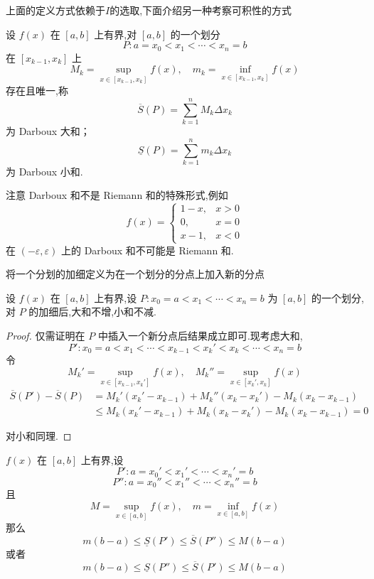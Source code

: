 上面的定义方式依赖于$I$的选取,下面介绍另一种考察可积性的方式
\begin{definition}
	
	设 $f(x)$ 在 $[a,b]$ 上有界,对 $[a,b]$ 的一个划分
	\[
	P: a = x_0 < x_1 < \cdots < x_n = b
	\]
	在 $[x_{k-1}, x_k]$ 上
	\[
	M_k = \sup_{x \in [x_{k-1}, x_k]} f(x), \quad m_k = \inf_{x \in [x_{k-1}, x_k]} f(x)
	\]
	存在且唯一,称
	\[
	\overline{S}(P) = \sum_{k=1}^n M_k \Delta x_k
	\]
	为 Darboux 大和；
	\[
	\underline{S}(P) = \sum_{k=1}^n m_k \Delta x_k
	\]
	为 Darboux 小和.
	
\end{definition}


注意 Darboux 和不是 Riemann 和的特殊形式,例如
\[
f(x)=
\begin{cases}
	1-x, & x>0 \\[4pt]
	0, & x=0 \\[4pt]
	x-1, & x<0
\end{cases}
\]
在 $(-\varepsilon, \varepsilon)$ 上的 Darboux 和不可能是 Riemann 和.
\begin{definition}
	将一个分划的加细定义为在一个划分的分点上加入新的分点
\end{definition}
\begin{lemma}\label{大和不增,小和不减}
	设 $f(x)$ 在 $[a,b]$ 上有界,设 $P: x_0 = a < x_1 < \cdots < x_n = b$ 为 $[a,b]$ 的一个划分,对 $P$ 的加细后,大和不增,小和不减.
\end{lemma}
\begin{proof}
	仅需证明在 $P$ 中插入一个新分点后结果成立即可.现考虑大和,
	\[
	P': x_0 = a < x_1 < \cdots < x_{k-1} < x_k' < x_k < \cdots < x_n = b
	\]
	令
	\[
	M_k' = \sup_{x \in [x_{k-1}, x_k']} f(x), \quad M_k'' = \sup_{x \in [x_k', x_k]} f(x)
	\]
	\[
	\begin{aligned}
		\overline{S}(P') - \overline{S}(P) &= M_k'(x_k' - x_{k-1}) + M_k''(x_k - x_k') - M_k(x_k - x_{k-1}) \\
		&\leq M_k(x_k' - x_{k-1}) + M_k(x_k - x_k') - M_k(x_k - x_{k-1}) = 0
	\end{aligned}
	\]
	
	对小和同理.
\end{proof}
\begin{lemma}
	$f(x)$ 在 $[a,b]$ 上有界,设
	\[
	P': a = x_0' < x_1' < \cdots < x_n' = b
	\]
	\[
	P'': a = x_0'' < x_1'' < \cdots < x_n'' = b
	\]
	且
	\[
	M = \sup_{x \in [a,b]} f(x), \quad m = \inf_{x \in [a,b]} f(x)
	\]
	那么
	\[
	m(b-a) \leq \underline{S}(P') \leq \overline{S}(P'') \leq M(b-a)
	\]
	或者
	\[
	m(b-a) \leq \underline{S}(P'') \leq \overline{S}(P') \leq M(b-a)
	\]
\end{lemma}
